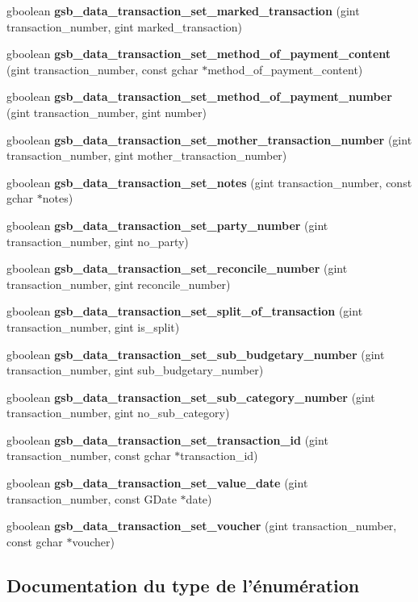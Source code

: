 \begin{DoxyCompactItemize}
\item 
gboolean {\bf gsb\_\-data\_\-transaction\_\-set\_\-marked\_\-transaction} (gint transaction\_\-number, gint marked\_\-transaction)
\item 
gboolean {\bf gsb\_\-data\_\-transaction\_\-set\_\-method\_\-of\_\-payment\_\-content} (gint transaction\_\-number, const gchar $\ast$method\_\-of\_\-payment\_\-content)
\item 
gboolean {\bf gsb\_\-data\_\-transaction\_\-set\_\-method\_\-of\_\-payment\_\-number} (gint transaction\_\-number, gint number)
\item 
gboolean {\bf gsb\_\-data\_\-transaction\_\-set\_\-mother\_\-transaction\_\-number} (gint transaction\_\-number, gint mother\_\-transaction\_\-number)
\item 
gboolean {\bf gsb\_\-data\_\-transaction\_\-set\_\-notes} (gint transaction\_\-number, const gchar $\ast$notes)
\item 
gboolean {\bf gsb\_\-data\_\-transaction\_\-set\_\-party\_\-number} (gint transaction\_\-number, gint no\_\-party)
\item 
gboolean {\bf gsb\_\-data\_\-transaction\_\-set\_\-reconcile\_\-number} (gint transaction\_\-number, gint reconcile\_\-number)
\item 
gboolean {\bf gsb\_\-data\_\-transaction\_\-set\_\-split\_\-of\_\-transaction} (gint transaction\_\-number, gint is\_\-split)
\item 
gboolean {\bf gsb\_\-data\_\-transaction\_\-set\_\-sub\_\-budgetary\_\-number} (gint transaction\_\-number, gint sub\_\-budgetary\_\-number)
\item 
gboolean {\bf gsb\_\-data\_\-transaction\_\-set\_\-sub\_\-category\_\-number} (gint transaction\_\-number, gint no\_\-sub\_\-category)
\item 
gboolean {\bf gsb\_\-data\_\-transaction\_\-set\_\-transaction\_\-id} (gint transaction\_\-number, const gchar $\ast$transaction\_\-id)
\item 
gboolean {\bf gsb\_\-data\_\-transaction\_\-set\_\-value\_\-date} (gint transaction\_\-number, const GDate $\ast$date)
\item 
gboolean {\bf gsb\_\-data\_\-transaction\_\-set\_\-voucher} (gint transaction\_\-number, const gchar $\ast$voucher)
\end{DoxyCompactItemize}


\subsection{Documentation du type de l'énumération}
